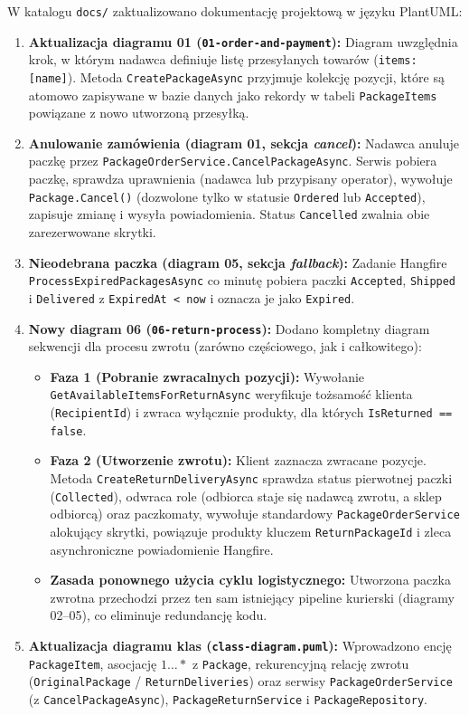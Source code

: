 \documentclass[10.5pt,a4paper]{article}
\begin{document}
W katalogu \texttt{docs/} zaktualizowano dokumentację projektową w języku PlantUML:
\begin{enumerate}[leftmargin=*,itemsep=2pt]
    \item \textbf{Aktualizacja diagramu 01 (\texttt{01-order-and-payment}):}
    Diagram uwzględnia krok, w którym nadawca definiuje listę przesyłanych towarów (\texttt{items: [name]}). Metoda \texttt{CreatePackageAsync} przyjmuje kolekcję pozycji, które są atomowo zapisywane w bazie danych jako rekordy w tabeli \texttt{PackageItems} powiązane z nowo utworzoną przesyłką.
    \item \textbf{Anulowanie zamówienia (diagram 01, sekcja \textit{cancel}):}
    Nadawca anuluje paczkę przez \texttt{PackageOrderService.CancelPackageAsync}. Serwis pobiera paczkę, sprawdza uprawnienia (nadawca lub przypisany operator), wywołuje \texttt{Package.Cancel()} (dozwolone tylko w statusie \texttt{Ordered} lub \texttt{Accepted}), zapisuje zmianę i wysyła powiadomienia. Status \texttt{Cancelled} zwalnia obie zarezerwowane skrytki.
    \item \textbf{Nieodebrana paczka (diagram 05, sekcja \textit{fallback}):}
    Zadanie Hangfire \texttt{ProcessExpiredPackagesAsync} co minutę pobiera paczki \texttt{Accepted}, \texttt{Shipped} i \texttt{Delivered} z \texttt{ExpiredAt < now} i oznacza je jako \texttt{Expired}.
    \item \textbf{Nowy diagram 06 (\texttt{06-return-process}):}
    Dodano kompletny diagram sekwencji dla procesu zwrotu (zarówno częściowego, jak i całkowitego):
    \begin{itemize}[itemsep=1pt]
        \item \textbf{Faza 1 (Pobranie zwracalnych pozycji):} Wywołanie \texttt{GetAvailableItemsForReturnAsync} weryfikuje tożsamość klienta (\texttt{RecipientId}) i zwraca wyłącznie produkty, dla których \texttt{IsReturned == false}.
        \item \textbf{Faza 2 (Utworzenie zwrotu):} Klient zaznacza zwracane pozycje. Metoda \texttt{CreateReturnDeliveryAsync} sprawdza status pierwotnej paczki (\texttt{Collected}), odwraca role (odbiorca staje się nadawcą zwrotu, a sklep odbiorcą) oraz paczkomaty, wywołuje standardowy \texttt{PackageOrderService} alokujący skrytki, powiązuje produkty kluczem \texttt{ReturnPackageId} i zleca asynchroniczne powiadomienie Hangfire.
        \item \textbf{Zasada ponownego użycia cyklu logistycznego:} Utworzona paczka zwrotna przechodzi przez ten sam istniejący pipeline kurierski (diagramy 02--05), co eliminuje redundancję kodu.
    \end{itemize}
    \item \textbf{Aktualizacja diagramu klas (\texttt{class-diagram.puml}):} Wprowadzono encję \texttt{PackageItem}, asocjację $1 \dots *$ z \texttt{Package}, rekurencyjną relację zwrotu (\texttt{OriginalPackage} / \texttt{ReturnDeliveries}) oraz serwisy \texttt{PackageOrderService} (z \texttt{CancelPackageAsync}), \texttt{PackageReturnService} i \texttt{PackageRepository}.
\end{enumerate}
\end{document}
